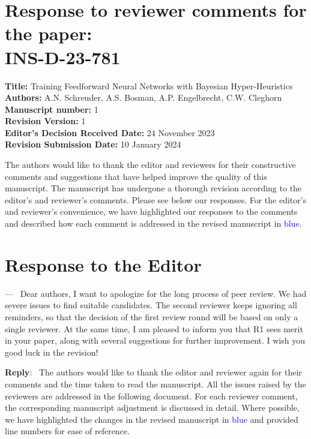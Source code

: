 \documentclass[12pt]{article}
\newcounter{reviewer}
\newcounter{point}[reviewer]
\newenvironment{point1}
   {\refstepcounter{point} \bigskip \noindent {\textbf{Editor Comment~}} ---\ }
   {\par }
\newenvironment{reply}
   {\medskip \noindent \color{blue} \begin{sf}\textbf{Reply}:\  }
   {\medskip \par \end{sf}}
\begin{document}
\section*{Response to reviewer comments for the paper:\\INS-D-23-781}
\vspace{10pt}

\textbf{Title:} Training Feedforward Neural Networks with Bayesian Hyper-Heuristics\\
\textbf{Authors:} A.N. Schreuder, A.S. Bosman, A.P. Engelbrecht, C.W. Cleghorn\\
\textbf{Manuscript number:} 1\\
\textbf{Revision Version:} 1\\
\textbf{Editor’s Decision Received Date:} 24 November 2023\\
\textbf{Revision Submission Date:} 10 January 2024\\

\vspace{10pt}

\noindent
The authors would like to thank the editor and reviewers for their constructive comments and suggestions that have helped improve the quality of this manuscript. The manuscript has undergone a thorough revision according to the editor's and reviewer's comments. Please see below our responses. For the editor's and reviewer's convenience, we have highlighted our responses to the comments and described how each comment is addressed in the revised manuscript in \textcolor{blue}{blue}.

\section*{Response to the Editor}

\begin{point1}
	Dear authors, I want to apologize for the long process of peer review. We had severe issues to find suitable candidates. The second reviewer keeps ignoring all reminders, so that the decision of the first review round will be based on only a single reviewer. At the same time, I am pleased to inform you that R1 sees merit in your paper, along with several suggestions for further improvement. I wish you good luck in the revision!
\end{point1}


\begin{reply}
	The authors would like to thank the editor and reviewer again for their comments and the time taken to read the manuscript. All the issues raised by the reviewers are addressed in the following document. For each reviewer comment, the corresponding manuscript adjustment is discussed in detail. Where possible, we have highlighted the changes in the revised manuscript in \textcolor{blue}{blue} and provided line numbers for ease of reference.
\end{reply}
\end{document}
